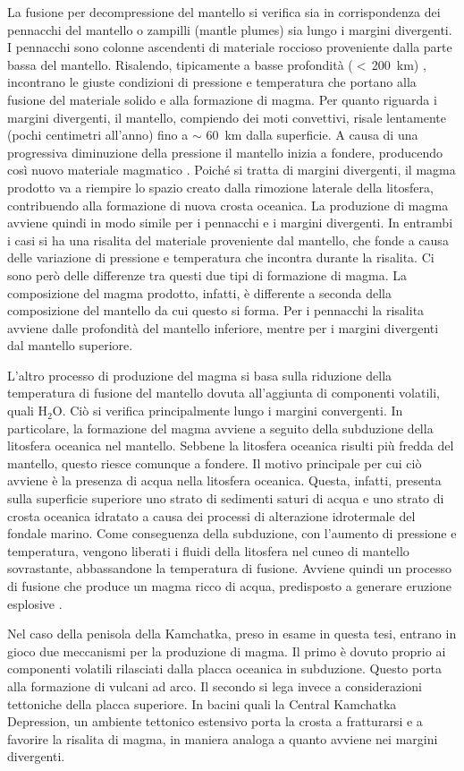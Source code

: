 La fusione per decompressione del mantello si verifica sia in corrispondenza dei pennacchi del mantello o zampilli (mantle plumes) sia lungo i margini divergenti.
I pennacchi sono colonne ascendenti di materiale roccioso proveniente dalla parte bassa del mantello. Risalendo, tipicamente a basse profondità (\(<\,\)\qty{200}{\kilo\meter}) \citep{encyclopedia}, incontrano le giuste condizioni di pressione e temperatura che portano alla fusione del materiale solido e alla formazione di magma.
Per quanto riguarda i margini divergenti, il mantello, compiendo dei moti convettivi, risale lentamente (pochi centimetri all'anno) fino a \(\sim\) \qty{60}{\kilo\meter} dalla superficie. A causa di una progressiva diminuzione della pressione il mantello inizia a fondere, producendo così nuovo materiale magmatico \citep{earle_plate_tectonics_2021}.
Poiché si tratta di margini divergenti, il magma prodotto va a riempire lo spazio creato dalla rimozione laterale della litosfera, contribuendo alla formazione di nuova crosta oceanica.
La produzione di magma avviene quindi in modo simile per i pennacchi e i margini divergenti. In entrambi i casi si ha una risalita del materiale proveniente dal mantello, che fonde a causa delle variazione di pressione e temperatura che incontra durante la risalita.
Ci sono però delle differenze tra questi due tipi di formazione di magma.
La composizione del magma prodotto, infatti, è differente a seconda della composizione del mantello da cui questo si forma. Per i pennacchi la risalita avviene dalle profondità del mantello inferiore, mentre per i margini divergenti dal mantello superiore.

L'altro processo di produzione del magma si basa sulla riduzione della temperatura di fusione del mantello dovuta all'aggiunta di componenti volatili, quali H\(_2\)O. Ciò si verifica principalmente lungo i margini convergenti. In particolare, la formazione del magma avviene a seguito della subduzione della litosfera oceanica nel mantello. Sebbene la litosfera oceanica risulti più fredda del mantello, questo riesce comunque a fondere. Il motivo principale per cui ciò avviene è la presenza di acqua nella litosfera oceanica.
Questa, infatti, presenta sulla superficie superiore uno strato di sedimenti saturi di acqua e uno strato di crosta oceanica idratato a causa dei processi di alterazione idrotermale del fondale marino. Come conseguenza della subduzione, con l'aumento di pressione e temperatura, vengono liberati i fluidi della litosfera nel cuneo di mantello sovrastante, abbassandone la temperatura di fusione. Avviene quindi un processo di fusione che produce un magma ricco di acqua, predisposto a generare eruzione esplosive \citep{encyclopedia}.

Nel caso della penisola della Kamchatka, preso in esame in questa tesi, entrano in gioco due meccanismi per la produzione di magma.
Il primo è dovuto proprio ai componenti volatili rilasciati dalla placca oceanica in subduzione. Questo porta alla formazione di vulcani ad arco. Il secondo si lega invece a considerazioni tettoniche della placca superiore. In bacini quali la Central Kamchatka Depression, un ambiente tettonico estensivo porta la crosta a fratturarsi e a favorire la risalita di magma, in maniera analoga a quanto avviene nei margini divergenti.

